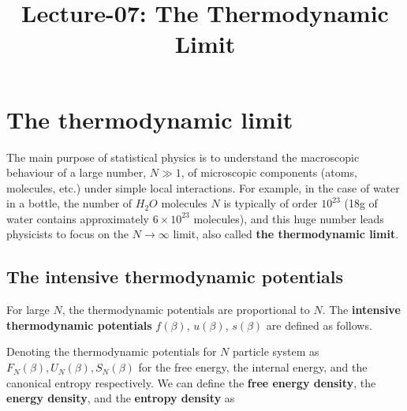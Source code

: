 \documentclass[letterpaper,english,10pt]{article}
\title{Lecture-07: The Thermodynamic Limit}
\begin{document}
\maketitle
\section{The thermodynamic limit}
The main purpose of statistical physics is to understand the macroscopic behaviour of a large number, $N \gg1$, of microscopic components (atoms, molecules, etc.) under simple local interactions. 
For example, in the case of water in a bottle, the number of $H_2 O$ molecules $N$ is typically of order $10^{23}$ (18g of water contains approximately $6 \times10^{23}$ molecules), and this huge number leads physicists to focus on the $N \to \infty$ limit, also called \textbf{the thermodynamic limit}.

\subsection{The intensive thermodynamic potentials}
For large $N$, the thermodynamic potentials are proportional to $N$. 
The \textbf{intensive thermodynamic potentials} $f (\beta)$, $u (\beta)$, $s (\beta)$ are defined as follows.

\begin{defn}
Denoting the thermodynamic potentials for $N$ particle system as $F_N (\beta), U_N (\beta), S_N (\beta)$ for the free energy, the internal energy, and the canonical entropy respectively. 
We can define the \textbf{free energy density},  the \textbf{energy density}, and the \textbf{entropy density} as 
\end{defn}
\end{document}
